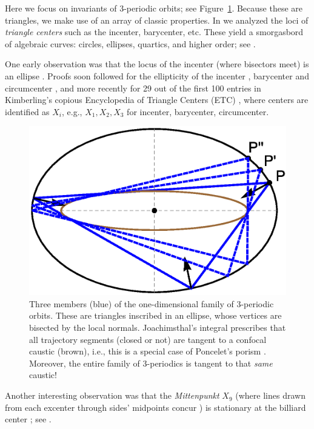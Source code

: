 Here we focus on invariants of 3-periodic orbits; see Figure~\ref{fig:three-orbits-proof}. Because these  are triangles, we make use of an array of classic properties. In \cite{reznik2019-intelligencer,reznik2020-loci} we analyzed the loci of {\em triangle centers} \cite{kimberling97-major-centers} such as the incenter, barycenter, etc. These yield a smorgasbord of algebraic curves: circles, ellipses, quartics, and higher order; see \cite{reznik2019-locus-gallery}.

One early observation was that the locus of the incenter (where bisectors meet) is an ellipse \cite[PL\#01]{reznik2020-playlist-proofs}. Proofs soon followed for the ellipticity of the incenter \cite{olga14}, barycenter \cite{sergei07_grid} and circumcenter \cite{corentin19,garcia2019-ellipses}, and more recently \cite{reznik2020-loci} for 29 out of the first 100 entries in Kimberling's copious Encyclopedia of Triangle Centers (ETC) \cite{etc}, where centers are identified as $X_i$, e.g., $X_1,X_2,X_3$ for incenter, barycenter, circumcenter.

\begin{figure}[H]
    \centering
    \includegraphics[width=.5\textwidth]{1020_three_orbits_proofs}
    \caption{Three members (blue) of the one-dimensional family of 3-periodic orbits. These are triangles inscribed in an ellipse, whose vertices are bisected by the local normals. Joachimsthal's integral \cite{sergei91} prescribes that all trajectory segments (closed or not) are tangent to a confocal caustic (brown), i.e., this is a special case of Poncelet's porism \cite{dragovic88}. Moreover, the entire family of 3-periodics is tangent to that {\em same} caustic!}
    \label{fig:three-orbits-proof}
\end{figure}

Another interesting observation was that the {\em Mittenpunkt} $X_9$ (where lines drawn from each excenter through sides' midpoints concur \cite[Mittenpunkt]{mw}) is stationary at the billiard center \cite{reznik2019-intelligencer}; see \cite[PL\#02]{reznik2020-playlist-proofs}. \\

